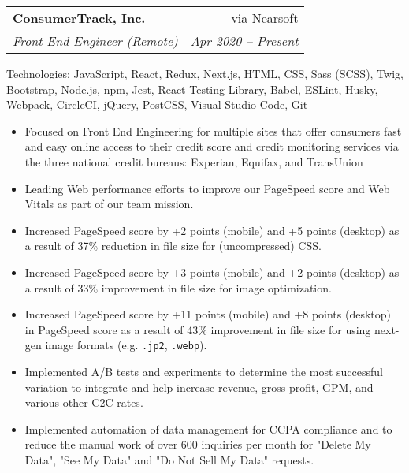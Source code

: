 \documentclass[letterpaper,11pt]{article}
\makeatletter
\newcommand{\resumeItem}[1]{
  \item\small{
    {#1 \vspace{-2pt}}
  }
}
\newcommand{\resumeSubheading}[4]{
  \vspace{0pt}\item
    \begin{tabular*}{0.97\textwidth}[t]{l@{\extracolsep{\fill}}r}
      \textbf{#1} & #2 \\
      \textit{\small#3} & \textit{\small #4}\vspace{5pt}\\
    \end{tabular*}\vspace{0pt}
}
\newcommand{\resumeItemListStart}{\begin{itemize}}
\newcommand{\resumeItemListEnd}{\end{itemize}\vspace{-5pt}}
\makeatother
\begin{document}
    \resumeSubheading
      {\href{https://www.consumertrack.com/}{ConsumerTrack, Inc.}}{via \href{https://nearsoft.com}{Nearsoft}}
      {Front End Engineer (Remote)}{Apr 2020 – Present}
      {\footnotesize Technologies: JavaScript, React, Redux, Next.js, HTML, CSS, Sass (SCSS), Twig, Bootstrap, Node.js, npm, Jest, React Testing Library, Babel, ESLint, Husky, Webpack, CircleCI, jQuery, PostCSS, Visual Studio Code, Git}
      \resumeItemListStart
        \resumeItem
          {Focused on Front End Engineering for multiple sites that offer consumers fast and easy online access to their credit score and credit monitoring services via the three national credit bureaus: Experian, Equifax, and TransUnion}
        \resumeItem
          {Leading Web performance efforts to improve our PageSpeed score and Web Vitals as part of our team mission.}
        \resumeItem
          {Increased PageSpeed score by +2 points (mobile) and +5 points (desktop) as a result of 37\% reduction in file size for (uncompressed) CSS.}
        \resumeItem
          {Increased PageSpeed score by +3 points (mobile) and +2 points (desktop) as a result of 33\% improvement in file size for image optimization.}
        \resumeItem
          {Increased PageSpeed score by +11 points (mobile) and +8 points (desktop) in PageSpeed score as a result of 43\% improvement in file size for using next-gen image formats (e.g. \texttt{.jp2}, \texttt{.webp}).}
        \resumeItem
          {Implemented A/B tests and experiments to determine the most successful variation to integrate and help increase revenue, gross profit, GPM, and various other C2C rates.}
        \resumeItem
          {Implemented automation of data management for CCPA compliance and to reduce the manual work of over 600 inquiries per month for "Delete My Data", "See My Data" and "Do Not Sell My Data" requests.}
      \resumeItemListEnd
\end{document}
